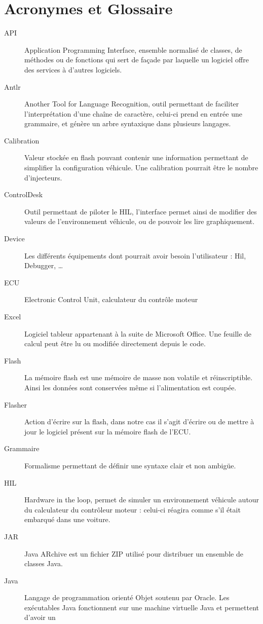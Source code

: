 \chapter{Acronymes et Glossaire}
\begin{description}
\item[API] Application Programming Interface, ensemble normalisé de classes, de méthodes ou de fonctions qui sert de façade par laquelle un
	logiciel offre des services à d'autres logiciels.
\item[Antlr] Another Tool for Language Recognition, outil permettant de faciliter l'interprétation d'une chaîne de caractère, celui-ci prend en entrée une
	grammaire, et génère un arbre syntaxique dans plusieurs langages.
\item[Calibration] Valeur stockée en flash pouvant contenir une information permettant de simplifier la configuration véhicule. Une
	calibration pourrait être le nombre d'injecteurs.
\item[ControlDesk] Outil permettant de piloter le HIL, l'interface permet ainsi de modifier des valeurs de l'environnement véhicule, ou de
	pouvoir les lire graphiquement.
\item[Device] Les différents équipements dont pourrait avoir besoin l'utilisateur : Hil, Debugger, \ldots 
\item[ECU] Electronic Control Unit, calculateur du contrôle moteur
\item[Excel] Logiciel tableur appartenant à la suite de Microsoft Office\textregistered. Une feuille de calcul peut être lu ou modifiée directement depuis le code.
\item[Flash] La mémoire flash est une mémoire de masse non volatile et réinscriptible. Ainsi les données sont conservées même si l'alimentation est coupée.
\item[Flasher] Action d'écrire sur la flash, dans notre cas il s'agit d'écrire ou de mettre à jour le logiciel présent sur la mémoire flash de l'ECU.
\item[Grammaire] Formalisme permettant de définir une syntaxe clair et non ambigüe.
\item[HIL] Hardware in the loop, permet de simuler un environnement véhicule autour du calculateur du contrôleur moteur : celui-ci réagira comme s'il était embarqué dans une voiture.
\item[JAR] Java ARchive est un fichier ZIP utilisé pour distribuer un ensemble de classes Java.
\item[Java] Langage de programmation orienté Objet soutenu par Oracle. Les exécutables Java fonctionnent sur une machine virtuelle Java et permettent d'avoir un

\end{description}
